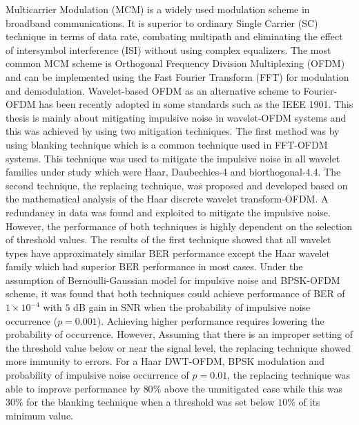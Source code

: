 \SingleSpacing
\noindent Multicarrier Modulation (MCM) is a widely used modulation scheme in broadband communications. It is superior to ordinary Single Carrier (SC) technique in terms of data rate, combating multipath and eliminating the effect of intersymbol interference (ISI) without using complex equalizers. The most common MCM scheme is Orthogonal Frequency Division Multiplexing (OFDM) and can be implemented using the Fast Fourier Transform (FFT) for modulation and demodulation. Wavelet-based OFDM as an alternative scheme to Fourier-OFDM has been recently adopted in some standards such as the IEEE 1901. This thesis is mainly about mitigating impulsive noise in wavelet-OFDM systems and this was achieved by using two mitigation techniques. The first method was by using blanking technique which is a common technique used in FFT-OFDM systems. This technique was used to mitigate the impulsive noise in all wavelet families under study which were Haar, Daubechies-4 and biorthogonal-4.4. The second technique, the replacing technique, was proposed and developed based on the mathematical analysis of the Haar discrete wavelet transform-OFDM. A redundancy in data was found and exploited to mitigate the impulsive noise. However, the performance of both techniques is highly dependent on the selection of threshold values. The results of the first technique showed that all wavelet types have approximately similar BER performance except the Haar wavelet family which had superior BER performance in most cases. Under the assumption of Bernoulli-Gaussian model for impulsive noise and BPSK-OFDM scheme, it was found that both techniques could achieve performance of BER of $ 1\times 10^{-4} $ with  $ 5 $ dB  gain in SNR when the probability of impulsive noise occurrence  ($ p=0.001 $). Achieving higher performance requires lowering the probability of occurrence.
 However, Assuming that there is an improper setting of the threshold value below or near the signal level, the replacing technique showed more immunity to errors. For a Haar DWT-OFDM, BPSK modulation and probability of impulsive noise occurrence of $ p=0.01 $, the replacing technique was able to improve performance by $ 80\% $ above the unmitigated case while this was  $ 30\% $ for the blanking technique when a threshold was set below $ 10\% $ of its minimum value. 
%
%
%
